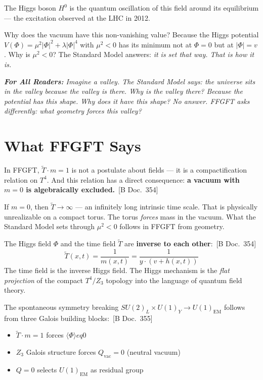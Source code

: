 \documentclass[11pt,oneside]{book}
\newcommand{\status}[1]{\penalty10000\,{\scriptsize\textcolor{gray!60}{[#1]}}}
\newenvironment{laierspur}{%
  \par\vspace{4pt}%
  \noindent\small\itshape\color{blue!60!black}%
  \textbf{For All Readers:}\enspace\ignorespaces}{%
  \par\vspace{4pt}\normalsize\normalfont\normalcolor}
\begin{document}
The Higgs boson $H^0$ is the quantum oscillation of this field around its
equilibrium --- the excitation observed at the LHC in 2012.

Why does the vacuum have this non-vanishing value? Because the Higgs
potential $V(\Phi) = \mu^2|\Phi|^2 + \lambda|\Phi|^4$ with $\mu^2 < 0$
has its minimum not at $\Phi = 0$ but at $|\Phi| = v$.
Why is $\mu^2 < 0$? The Standard Model answers: \textit{it is set that
way. That is how it is.}

\begin{laierspur}
Imagine a valley. The Standard Model says: the universe sits in the valley
because the valley is there. Why is the valley there? Because the potential
has this shape. Why does it have this shape? No answer.
FFGFT asks differently: what geometry forces this valley?
\end{laierspur}

\section*{What FFGFT Says}

In FFGFT, $\tilde{T} \cdot m = 1$ is not a postulate about fields ---
it is a compactification relation on $T^4$. And this relation has a
direct consequence: \textbf{a vacuum with $m = 0$ is algebraically
excluded.} \status{B Doc.~354}

If $m = 0$, then $\tilde{T} \to \infty$ --- an infinitely long intrinsic
time scale. That is physically unrealizable on a compact torus. The torus
\textit{forces} mass in the vacuum. What the Standard Model sets through
$\mu^2 < 0$ follows in FFGFT from geometry.

The Higgs field $\Phi$ and the time field $\tilde{T}$ are \textbf{inverse
to each other}: \status{B Doc.~354}
\[
  \tilde{T}(x,t) = \frac{1}{m(x,t)} = \frac{1}{y \cdot (v + h(x,t))}
\]
The time field is the inverse Higgs field. The Higgs mechanism is the
\textit{flat projection} of the compact $T^4/Z_3$ topology into the
language of quantum field theory.

The spontaneous symmetry breaking $SU(2)_L \times U(1)_Y \to U(1)_\text{EM}$
follows from three Galois building blocks: \status{B Doc.~355}
\begin{itemize}
  \item $\tilde{T}\cdot m=1$ forces $\langle\Phi\rangle 
eq 0$
  \item $Z_3$ Galois structure forces $Q_\text{vac}=0$ (neutral vacuum)
  \item $Q=0$ selects $U(1)_\text{EM}$ as residual group
\end{itemize}
\end{document}
